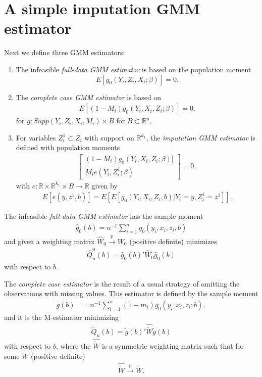 \documentclass{article}
\theoremstyle{definition}
\theoremstyle{remark}
\begin{document}
\section{A simple imputation GMM estimator}
Next we define three GMM estimators: 
\begin{enumerate}
	\item The infeasible \emph{full-data GMM estimator} is based on the population moment
	\[E[g_0(Y_i, Z_i, X_i; \beta)]=0.
	\]
	\item The \emph{complete case GMM estimator} is based on
	\begin{align}
	E\left[(1-M_i) g_0(Y_i, X_i,Z_i; \beta )\right]=0.
	\end{align}
	for $\tilde{g}: Supp(Y_i, Z_i, X_i, M_i) \times B$ for $B \subset \mathbb{R}^p,$
	\item For variables $Z^1_i \subset Z_i$ with support on $\mathbb{R}^{k_1}$, the \emph{imputation GMM estimator} is defined with population moments
	\begin{align}
	\left[\begin{array}{c}
	(1-M_i) g_0(Y_i,X_i,Z_i;\beta)]\\
	M_i e(Y_i, Z_i^1; \beta)
	\end{array}\right]=0,
	\end{align}
	with $e: \mathbb{R} \times \mathbb{R}^{k_1}\times B \rightarrow \mathbb{R}$ given by
	\begin{align}
	E[e(y, z^1,b)]= E[E[g_0(Y_i, X_i,Z_i, b)|Y_i=y, Z_i^1=z^1]].
	\end{align}
\end{enumerate}

The infeasible \emph{full-data GMM estimator} has the sample moment
\begin{align}
\hat{g}_0(b) = n^{-1}\sum_{i=1}^n g_0(y_i,x_i,z_i,b)
\end{align}
and given a weighting matrix $\hat{W}_0\stackrel{p}{\rightarrow} W_0$ (positive definite) minimizes
\begin{align}
\hat{Q}^0_n(b)= \hat{g}_0(b)'\hat{W}_0\hat{g}_0(b)
\end{align}
with respect to $b$.

The \textit{complete case estimator} is the result of a usual strategy of omitting the observations with missing values. This estimator is defined by the sample moment
\begin{align}
\tilde{g}(b)&= n^{-1}\sum_{i=1}^n
(1-m_i) g_0(y_i,x_i, z_i; b),
\end{align}
and it is the M-estimator minimizing
\begin{align}
\tilde{Q}_n(b)= \tilde{g}(b)'\hat{\tilde{W}}\tilde{g}(b)
\end{align}
with respect to $b$, where the $\hat{\tilde{W}}$ is a symmetric weighting matrix such that for some $\tilde{W}$ (positive definite)
\begin{align}
\hat{\tilde{W}} \stackrel{p}{\rightarrow}\tilde{W}.
\end{align}
\end{document}
